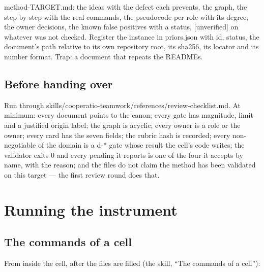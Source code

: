 \documentclass[
  american,
  10pt,
]{report}
\renewcommand{\texttt}[1]{{\ttfamily\hyphenchar\font=-1 #1}}
\begin{document}
\texttt{method-\allowbreak{}TARGET.\allowbreak{}md}: the ideas with the
defect each prevents, the graph, the step by step with the real
commands, the pseudocode per role with its degree, the owner decisions,
the known false positives with a status, \texttt{[unverified]} on
whatever was not checked. Register the instance in
\texttt{priors.\allowbreak{}json} with id, status, the document's path
relative to its own repository root, its sha256, its locator and its
number format. Trap: a document that repeats the READMEs.

\section{Before handing over}\label{before-handing-over}

Run through
\texttt{skills/\allowbreak{}cooperatio-\allowbreak{}teamwork/\allowbreak{}references/\allowbreak{}review-\allowbreak{}checklist.\allowbreak{}md}.
At minimum: every document points to the canon; every gate has
magnitude, limit and a justified origin label; the graph is acyclic;
every owner is a role or the owner; every card has the seven fields; the
rubric hash is recorded; every non-negotiable of the domain is a
\texttt{d-\allowbreak{}*} gate whose result the cell's code writes; the
validator exits 0 and every pending it reports is one of the four it
accepts by name, with the reason; and the files do not claim the method
has been validated on this target --- the first review round does that.

\chapter{Running the instrument}\label{running-the-instrument}

\section{The commands of a cell}\label{the-commands-of-a-cell}

From inside the cell, after the files are filled (the skill, ``The
commands of a cell''):
\end{document}
